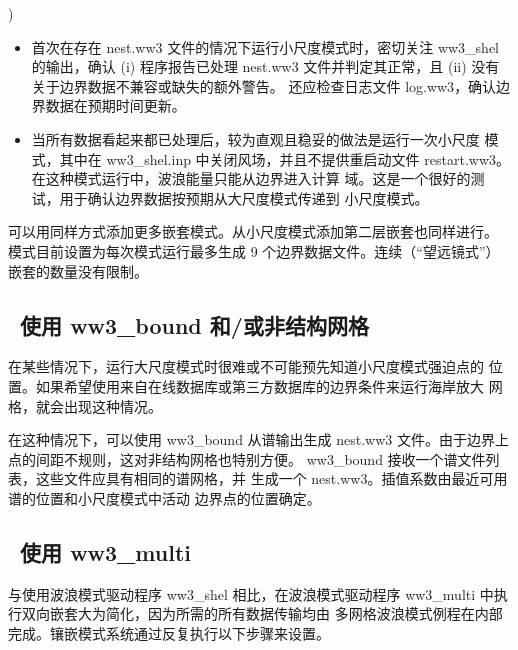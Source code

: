 \begin{list}{)}{
             \rightmargin 5mm 
              \leftmargin 10mm}
\begin{itemize}

\item 首次在存在 {\file nest.ww3} 文件的情况下运行小尺度模式时，密切关注
      {\code ww3\_shel} 的输出，确认 (i) 程序报告已处理 {\file nest.ww3}
      文件并判定其正常，且 (ii) 没有关于边界数据不兼容或缺失的额外警告。
      还应检查日志文件 {\file log.ww3}，确认边界数据在预期时间更新。

\item 当所有数据看起来都已处理后，较为直观且稳妥的做法是运行一次小尺度
      模式，其中在 {\file ww3\_shel.inp} 中关闭风场，并且不提供重启动文件
      {\file restart.ww3}。在这种模式运行中，波浪能量只能从边界进入计算
      域。这是一个很好的测试，用于确认边界数据按预期从大尺度模式传递到
      小尺度模式。

\end{itemize}

\end{list}

\noindent
可以用同样方式添加更多嵌套模式。从小尺度模式添加第二层嵌套也同样进行。
模式目前设置为每次模式运行最多生成 9 个边界数据文件。连续（“望远镜式”）
嵌套的数量没有限制。

\vssub
\subsection{~使用 {\file ww3\_bound} 和/或非结构网格}
\vssub

在某些情况下，运行大尺度模式时很难或不可能预先知道小尺度模式强迫点的
位置。如果希望使用来自在线数据库或第三方数据库的边界条件来运行海岸放大
网格，就会出现这种情况。

在这种情况下，可以使用 {\code ww3\_bound} 从谱输出生成 {\file nest.ww3}
文件。由于边界上点的间距不规则，这对非结构网格也特别方便。
{\code ww3\_bound} 接收一个谱文件列表，这些文件应具有相同的谱网格，并
生成一个 {\file nest.ww3}。插值系数由最近可用谱的位置和小尺度模式中活动
边界点的位置确定。

\pb
\subsection{~使用 {\file ww3\_multi}}
\vssub

与使用波浪模式驱动程序 {\file ww3\_shel} 相比，在波浪模式驱动程序
{\file ww3\_multi} 中执行双向嵌套大为简化，因为所需的所有数据传输均由
多网格波浪模式例程在内部完成。镶嵌模式系统通过反复执行以下步骤来设置。

